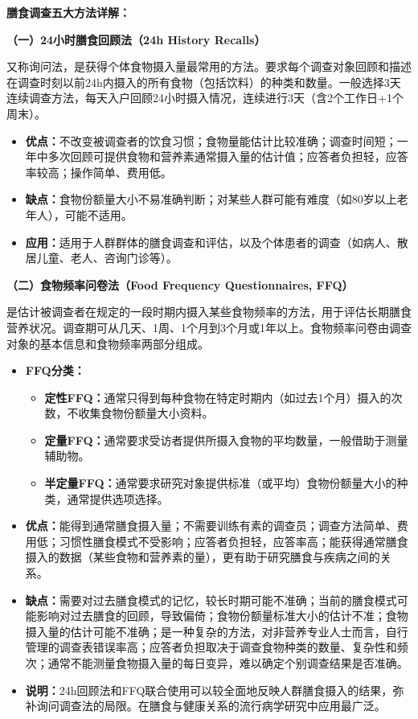 \begin{defbox}
\textbf{膳食调查五大方法详解：}

\textbf{（一）24小时膳食回顾法（24h History Recalls）}

又称询问法，是获得个体食物摄入量最常用的方法。要求每个调查对象回顾和描述在调查时刻以前24h内摄入的所有食物（包括饮料）的种类和数量。一般选择3天连续调查方法，每天入户回顾24小时摄入情况，连续进行3天（含2个工作日+1个周末）。

\begin{itemize}[leftmargin=*]
    \item \textbf{优点：}不改变被调查者的饮食习惯；食物量能估计比较准确；调查时间短；一年中多次回顾可提供食物和营养素通常摄入量的估计值；应答者负担轻，应答率较高；操作简单、费用低。
    \item \textbf{缺点：}食物份额量大小不易准确判断；对某些人群可能有难度（如80岁以上老年人），可能不适用。
    \item \textbf{应用：}适用于人群群体的膳食调查和评估，以及个体患者的调查（如病人、散居儿童、老人、咨询门诊等）。
\end{itemize}

\textbf{（二）食物频率问卷法（Food Frequency Questionnaires, FFQ）}

是估计被调查者在规定的一段时期内摄入某些食物频率的方法，用于评估长期膳食营养状况。调查期可从几天、1周、1个月到3个月或1年以上。食物频率问卷由调查对象的基本信息和食物频率两部分组成。

\begin{itemize}[leftmargin=*]
    \item \textbf{FFQ分类：}
    \begin{itemize}
        \item \textbf{定性FFQ：}通常只得到每种食物在特定时期内（如过去1个月）摄入的次数，不收集食物份额量大小资料。
        \item \textbf{定量FFQ：}通常要求受访者提供所摄入食物的平均数量，一般借助于测量辅助物。
        \item \textbf{半定量FFQ：}通常要求研究对象提供标准（或平均）食物份额量大小的种类，通常提供选项选择。
    \end{itemize}
    \item \textbf{优点：}能得到通常膳食摄入量；不需要训练有素的调查员；调查方法简单、费用低；习惯性膳食模式不受影响；应答者负担轻，应答率高；能获得通常膳食摄入的数据（某些食物和营养素的量），更有助于研究膳食与疾病之间的关系。
    \item \textbf{缺点：}需要对过去膳食模式的记忆，较长时期可能不准确；当前的膳食模式可能影响对过去膳食的回顾，导致偏倚；食物份额量标准大小的估计不准；食物摄入量的估计可能不准确；是一种复杂的方法，对非营养专业人士而言，自行管理的调查表错误率高；应答者负担取决于调查食物种类的数量、复杂性和频次；通常不能测量食物摄入量的每日变异，难以确定个别调查结果是否准确。
    \item \textbf{说明：}24h回顾法和FFQ联合使用可以较全面地反映人群膳食摄入的结果，弥补询问调查法的局限。在膳食与健康关系的流行病学研究中应用最广泛。
\end{itemize}


\end{defbox}
